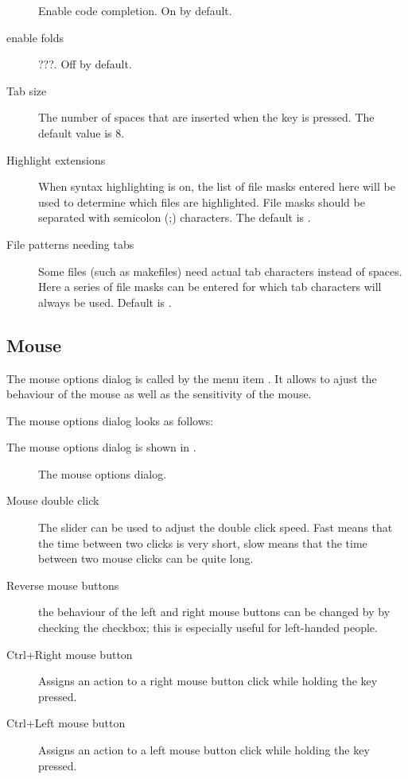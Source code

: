\begin{description}
Enable code completion. On by default.
\item[enable folds]
???. Off by default.
\item[Tab size]
The number of spaces that are inserted when the  key is pressed.
The default value is 8.
\item[Highlight extensions]
When syntax highlighting is on, the list of file masks entered here will be
used to determine which files are highlighted. File masks should be
separated with semicolon (;) characters. The default is
.
\item[File patterns needing tabs]
Some files (such as makefiles) need actual tab characters instead of spaces. 
Here a series of file masks can be entered for which tab characters will
always be used. Default is .
\end{description}

%
%
\subsection{Mouse}
\label{se:prefmouse}
The mouse options dialog is called by the menu item
. It allows to ajust the behaviour of the
mouse as well as the sensitivity of the mouse.
\begin{htmlonly}
The mouse options dialog looks as follows:
\end{htmlonly}
\begin{latexonly}
The mouse options dialog is shown in .
\begin{figure}[ht]
\begin{center}
\caption{The mouse options dialog.}\label{fig:omouse}
\ifpdf
{}
\else
{}
\fi
\end{center}
\end{figure}
\end{latexonly}
\begin{description}
\item[Mouse double click]
The slider can be used to adjust the double click speed. Fast means that the
time between two clicks is very short, slow means that the time between two
mouse clicks can be quite long.
\item[Reverse mouse buttons]
the behaviour of the left and right mouse buttons can be changed by
by checking the checkbox; this is especially useful for left-handed people.
\item[Ctrl+Right mouse button]
Assigns an action to a right mouse button click while holding the 
 key pressed.
\item[Ctrl+Left mouse button]
Assigns an action to a left mouse button click while holding the 
 key pressed.
\end{description}

